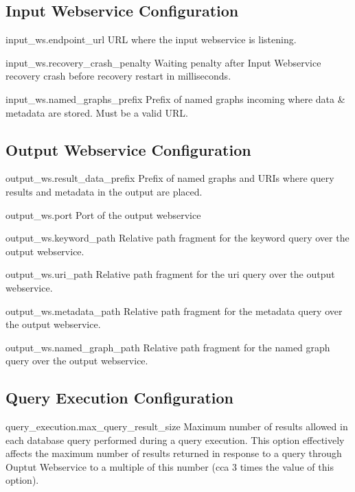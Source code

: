 \subsection*{Input Webservice Configuration}
\begin{configlist}
	\item[input\_ws.endpoint\_url]
		URL where the input webservice is listening.
	\item[input\_ws.recovery\_crash\_penalty]
		Waiting penalty after Input Webservice recovery crash before recovery restart in milliseconds.
	\item[input\_ws.named\_graphs\_prefix]
		Prefix of named graphs incoming where data \& metadata are stored. Must be a valid URL.
\end{configlist}

\subsection*{Output Webservice Configuration}
\begin{configlist}
	\item[output\_ws.result\_data\_prefix]
		Prefix of named graphs and URIs where query results and metadata in the output are placed.
	\item[output\_ws.port]
		Port of the output webservice
	\item[output\_ws.keyword\_path]
		Relative path fragment for the keyword query over the output webservice.
	\item[output\_ws.uri\_path]
		Relative path fragment for the uri query over the output webservice.
	\item[output\_ws.metadata\_path]
		Relative path fragment for the metadata query over the output webservice.
	\item[output\_ws.named\_graph\_path]
		Relative path fragment for the named graph query over the output webservice.
\end{configlist}

\subsection*{Query Execution Configuration}	
\begin{configlist}
	\item[query\_execution.max\_query\_result\_size]
		Maximum number of results allowed in each database query performed during a query execution. This option effectively affects the maximum number of results returned in response to a query through Ouptut Webservice to a multiple of this number (cca 3 times the value of this option).
\end{configlist}


